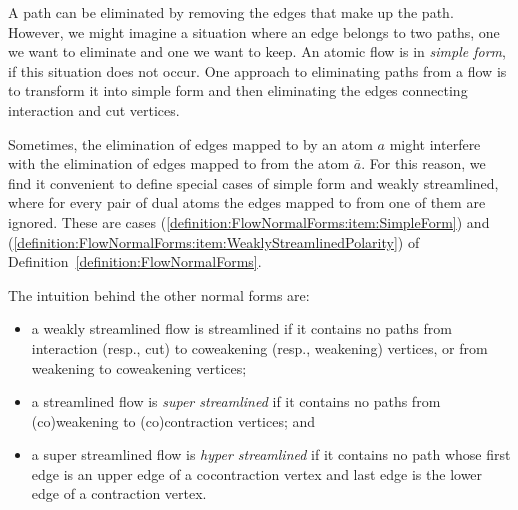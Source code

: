 A path can be eliminated by removing the edges that make up the path. However, we might imagine a situation where an edge belongs to two paths, one we want to eliminate and one we want to keep. An atomic flow is in \emph{simple form}, if this situation does not occur. One approach to eliminating paths from a flow is to transform it into simple form and then eliminating the edges connecting interaction and cut vertices.

Sometimes, the elimination of edges mapped to by an atom $a$ might interfere with the elimination of edges mapped to from the atom $\bar a$. For this reason, we find it convenient to define special cases of simple form and weakly streamlined, where for every pair of dual atoms the edges mapped to from one of them are ignored. These are cases (\ref{definition:FlowNormalForms:item:SimpleForm}) and (\ref{definition:FlowNormalForms:item:WeaklyStreamlinedPolarity}) of Definition~\ref{definition:FlowNormalForms}.


The intuition behind the other normal forms are:
\begin{itemize}
\item a weakly streamlined flow is streamlined if it contains no paths from interaction (resp., cut) to coweakening (resp., weakening) vertices, or from weakening to coweakening vertices;
\item a streamlined flow is \emph{super streamlined} if it contains no paths from (co)weakening to (co)contraction vertices; and
\item a super streamlined flow is \emph{hyper streamlined} if it contains no path whose first edge is an upper edge of a cocontraction vertex and last edge is the lower edge of a contraction vertex.
\end{itemize}




